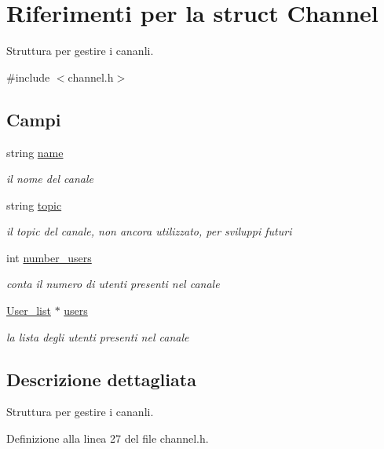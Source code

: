 \hypertarget{structChannel}{}\section{Riferimenti per la struct Channel}
\label{structChannel}


Struttura per gestire i cananli.  




{\ttfamily \#include $<$channel.\+h$>$}

\subsection*{Campi}
\begin{DoxyCompactItemize}
\item 
string \hyperlink{structChannel_ada27be4a604630621c5de998c7f4a418}{name}
\begin{DoxyCompactList}\small\item\em il nome del canale \end{DoxyCompactList}\item 
string \hyperlink{structChannel_af6f2434547b280ffbead9234e9826a74}{topic}
\begin{DoxyCompactList}\small\item\em il topic del canale, non ancora utilizzato, per sviluppi futuri \end{DoxyCompactList}\item 
int \hyperlink{structChannel_a9dbe5af669a270a0fd46c89c65c235c3}{number\+\_\+users}
\begin{DoxyCompactList}\small\item\em conta il numero di utenti presenti nel canale \end{DoxyCompactList}\item 
\hyperlink{user_8h_a2bea59709d82bd0d4c29c992bf9c7607}{User\+\_\+list} $\ast$ \hyperlink{structChannel_a69e65fd40834071da14e9bdb58cb538f}{users}
\begin{DoxyCompactList}\small\item\em la lista degli utenti presenti nel canale \end{DoxyCompactList}\end{DoxyCompactItemize}


\subsection{Descrizione dettagliata}
Struttura per gestire i cananli. 

Definizione alla linea 27 del file channel.\+h.



